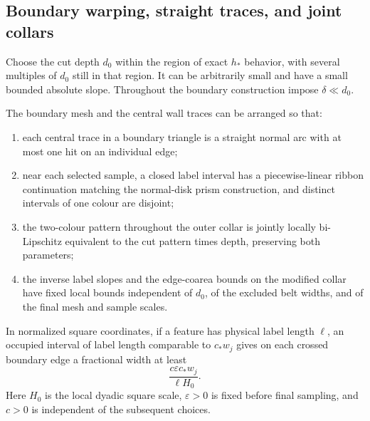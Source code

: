 \subsection{Boundary warping, straight traces, and joint collars}

Choose the cut depth $d_0$ within the region of exact $h_*$ behavior,
with several multiples of $d_0$ still in that region.  It can be
arbitrarily small and have a small bounded absolute slope.  Throughout
the boundary construction impose $\delta\ll d_0$.

\begin{lemma}
\label{ms:boundary-collar}
The boundary mesh and the central wall traces can be arranged so that:
\begin{enumerate}
\item each central trace in a boundary triangle is a straight normal
arc with at most one hit on an individual edge;
\item near each selected sample, a closed label interval has a
piecewise-linear ribbon continuation matching the normal-disk prism
construction, and distinct intervals of one colour are disjoint;
\item the two-colour pattern throughout the outer collar is jointly
locally bi-Lipschitz equivalent to the cut pattern times depth,
preserving both parameters;
\item the inverse label slopes and the edge-coarea bounds on the
modified collar have fixed local bounds independent of $d_0$, of the
excluded belt widths, and of the final mesh and sample scales.
\end{enumerate}
In normalized square coordinates, if a feature has physical label
length $\ell$, an occupied interval of label length comparable to
$c_*w_j$ gives on each crossed boundary edge a fractional width at
least
\begin{equation}
 \frac{c\varepsilon c_*w_j}{\ell H_0}.
 \label{ms:boundary-width}
\end{equation}
Here $H_0$ is the local dyadic square scale, $\varepsilon>0$ is fixed
before final sampling, and $c>0$ is independent of the subsequent
choices.
\end{lemma}

